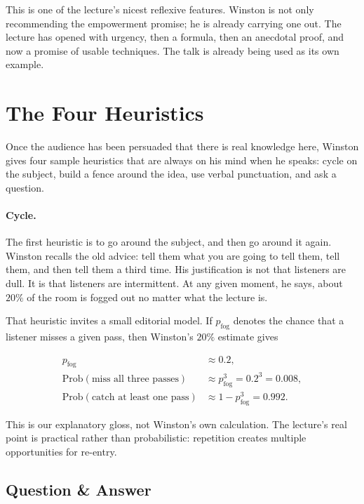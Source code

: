 This is one of the lecture's nicest reflexive features. Winston is not only recommending the empowerment promise; he is already carrying one out. The lecture has opened with urgency, then a formula, then an anecdotal proof, and now a promise of usable techniques. The talk is already being used as its own example.

\section{The Four Heuristics}

Once the audience has been persuaded that there is real knowledge here, Winston gives four sample heuristics that are always on his mind when he speaks: cycle on the subject, build a fence around the idea, use verbal punctuation, and ask a question.

\paragraph{Cycle.} The first heuristic is to go around the subject, and then go around it again. Winston recalls the old advice: tell them what you are going to tell them, tell them, and then tell them a third time. His justification is not that listeners are dull. It is that listeners are intermittent. At any given moment, he says, about \(20\%\) of the room is fogged out no matter what the lecture is.

That heuristic invites a small editorial model. If \(p_{\mathrm{fog}}\) denotes the chance that a listener misses a given pass, then Winston's \(20\%\) estimate gives

\begin{align}
p_{\mathrm{fog}} &\approx 0.2,\\
\mathrm{Prob}(\text{miss all three passes}) &\approx p_{\mathrm{fog}}^3 = 0.2^3 = 0.008,\\
\mathrm{Prob}(\text{catch at least one pass}) &\approx 1-p_{\mathrm{fog}}^3 = 0.992.
\end{align}

\begin{remark}
This is our explanatory gloss, not Winston's own calculation. The lecture's real point is practical rather than probabilistic: repetition creates multiple opportunities for re-entry.
\end{remark}

\subsection{Question \& Answer}

